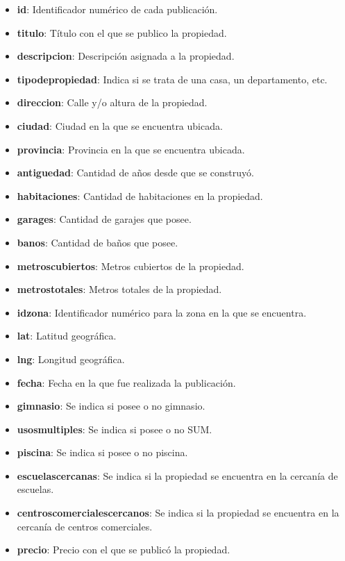 \documentclass[
10pt, %
a4paper, %
oneside, %
headinclude,footinclude, %
BCOR5mm, %
]{scrartcl}
\begin{document}
\begin{itemize}

    \item \textbf{id}: Identificador num\'erico de cada publicaci\'on.
    \item \textbf{titulo}: T\'itulo con el que se publico la propiedad.
    \item \textbf{descripcion}: Descripci\'on asignada a la propiedad.
    \item \textbf{tipodepropiedad}: Indica si se trata de una casa, un departamento, etc.
    \item \textbf{direccion}: Calle y/o altura de la propiedad.
    \item \textbf{ciudad}: Ciudad en la que se encuentra ubicada.
    \item \textbf{provincia}: Provincia en la que se encuentra ubicada.
    \item \textbf{antiguedad}: Cantidad de años desde que se construy\'o.
    \item \textbf{habitaciones}: Cantidad de habitaciones en la propiedad.
    \item \textbf{garages}: Cantidad de garajes que posee.
    \item \textbf{banos}: Cantidad de baños que posee.
    \item \textbf{metroscubiertos}: Metros cubiertos de la propiedad.
    \item \textbf{metrostotales}: Metros totales de la propiedad.
    \item \textbf{idzona}: Identificador num\'erico para la zona en la que se encuentra.
    \item \textbf{lat}: Latitud geogr\'afica.
    \item \textbf{lng}: Longitud geogr\'afica.
    \item \textbf{fecha}: Fecha en la que fue realizada la publicaci\'on.
    \item \textbf{gimnasio}: Se indica si posee o no gimnasio.
    \item \textbf{usosmultiples}: Se indica si posee o no SUM.
    \item \textbf{piscina}: Se indica si posee o no piscina.
    \item \textbf{escuelascercanas}: Se indica si la propiedad se encuentra en la cercan\'ia de escuelas.
    \item \textbf{centroscomercialescercanos}: Se indica si la propiedad se encuentra en la cercan\'ia de centros comerciales.
    \item \textbf{precio}: Precio con el que se public\'o la propiedad.

\end{itemize}
\end{document}
